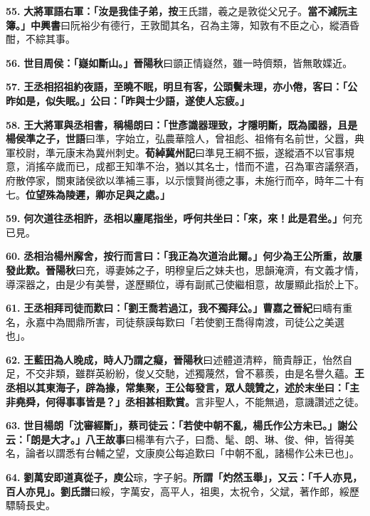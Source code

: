 \textbf{55.} \textbf{大將軍語右軍：「汝是我佳子弟，}{\footnotesize \textbf{按}王氏譜，羲之是敦從父兄子。}\textbf{當不減阮主簿。」}{\footnotesize \textbf{中興書}曰阮裕少有德行，王敦聞其名，召為主簿，知敦有不臣之心，縱酒昏酣，不綜其事。}

\textbf{56.} \textbf{世目周侯：「嶷如斷山。」}{\footnotesize \textbf{晉陽秋}曰顗正情嶷然，雖一時儕類，皆無敢媟近。}

\textbf{57.} \textbf{王丞相招祖約夜語，至曉不眠，明旦有客，公頭鬢未理，亦小倦，客曰：「公昨如是，似失眠。」公曰：「昨與士少語，遂使人忘疲。」}

\textbf{58.} \textbf{王大將軍與丞相書，稱楊朗曰：「世彥識器理致，才隱明斷，既為國器，且是楊侯準之子，}{\footnotesize \textbf{世語}曰準，字始立，弘農華陰人，曾祖彪、祖脩有名前世，父囂，典軍校尉，準元康末為冀州刺史。\textbf{荀綽冀州記}曰準見王綱不振，遂縱酒不以官事規意，消搖卒歲而已，成都王知準不治，猶以其名士，惜而不遣，召為軍咨議祭酒，府散停家，關東諸侯欲以準補三事，以示懷賢尚德之事，未施行而卒，時年二十有七。}\textbf{位望殊為陵遲，卿亦足與之處。」}

\textbf{59.} \textbf{何次道往丞相許，丞相以麈尾指坐，呼何共坐曰：「來，來！此是君坐。」}{\footnotesize 何充已見。}

\textbf{60.} \textbf{丞相治楊州廨舍，按行而言曰：「我正為次道治此爾。」何少為王公所重，故屢發此歎。}{\footnotesize \textbf{晉陽秋}曰充，導妻姊之子，明穆皇后之妹夫也，思韻淹濟，有文義才情，導深器之，由是少有美譽，遂歷顯位，導有副貳己使繼相意，故屢顯此指於上下。}

\textbf{61.} \textbf{王丞相拜司徒而歎曰：「劉王喬若過江，我不獨拜公。」}{\footnotesize \textbf{曹嘉之晉紀}曰疇有重名，永嘉中為閻鼎所害，司徒蔡謨每歎曰「若使劉王喬得南渡，司徒公之美選也」。}

\textbf{62.} \textbf{王藍田為人晚成，時人乃謂之癡，}{\footnotesize \textbf{晉陽秋}曰述體道清粹，簡貴靜正，怡然自足，不交非類，雖群英紛紛，俊乂交馳，述獨蔑然，曾不慕羨，由是名譽久蘊。}\textbf{王丞相以其東海子，辟為掾，常集聚，王公每發言，眾人競贊之，述於末坐曰：「主非堯舜，何得事事皆是？」丞相甚相歎賞。}{\footnotesize 言非聖人，不能無過，意譏讚述之徒。}

\textbf{63.} \textbf{世目楊朗「沈審經斷」，蔡司徒云：「若使中朝不亂，楊氏作公方未已。」謝公云：「朗是大才。」}{\footnotesize \textbf{八王故事}曰楊準有六子，曰喬、髦、朗、琳、俊、伸，皆得美名，論者以謂悉有台輔之望，文康庾公每追歎曰「中朝不亂，諸楊作公未已也」。}

\textbf{64.} \textbf{劉萬安即道真從子，庾公}{\footnotesize 琮，字子躬。}\textbf{所謂「灼然玉舉」，又云：「千人亦見，百人亦見」。}{\footnotesize \textbf{劉氏譜}曰綏，字萬安，高平人，祖奧，太祝令，父斌，著作郎，綏歷驃騎長史。}


